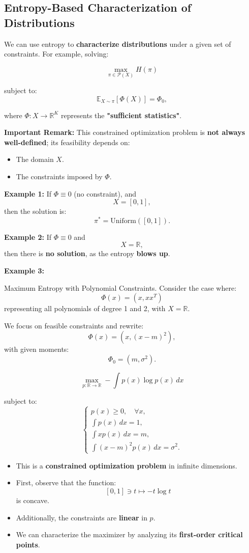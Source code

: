 \documentclass{article}
\begin{document}
\subsection{Entropy-Based Characterization of Distributions}

We can use entropy to \textbf{characterize distributions} under a given set of constraints. For example, solving:

\[
\max_{\pi \in \mathcal{P}(X)} H(\pi)
\]

subject to:
\[
\mathbb{E}_{X \sim \pi} [\Phi(X)] = \Phi_0,
\]

where \( \Phi: X \to \mathbb{R}^K \) represents the \textbf{"sufficient statistics"}.

\textbf{Important Remark:}
This constrained optimization problem is \textbf{not always well-defined}; its feasibility depends on:
\begin{itemize}
    \item The domain \( X \).
    \item The constraints imposed by \( \Phi \).
\end{itemize}

\textbf{Example 1:} If \( \Phi \equiv 0 \) (no constraint), and
\[
X = [0,1],
\]
then the solution is:
\[
\pi^* = \text{Uniform}([0,1]).
\]

\textbf{Example 2:} If \( \Phi \equiv 0 \) and 
\[
X = \mathbb{R},
\]
then there is \textbf{no solution}, as the entropy \textbf{blows up}.

\textbf{Example 3:}

Maximum Entropy with Polynomial Constraints. 
Consider the case where:
\[
\Phi(x) = (x, x x^T)
\]
representing all polynomials of degree 1 and 2, with \( X = \mathbb{R} \).

We focus on feasible constraints and rewrite:
\[
\Phi(x) = (x, (x - m)^2),
\]
with given moments:
\[
\Phi_0 = (m, \sigma^2).
\]

\[
\max_{p: \mathbb{R} \to \mathbb{R}} - \int p(x) \log p(x) \, dx
\]

subject to:
\[
\begin{cases}
p(x) \geq 0, \quad \forall x, \\
\int p(x) \, dx = 1, \\
\int x p(x) \, dx = m, \\
\int (x - m)^2 p(x) \, dx = \sigma^2.
\end{cases}
\]

\begin{itemize}
    \item This is a \textbf{constrained optimization problem} in infinite dimensions.
    \item First, observe that the function:
    \[
    [0,1] \ni t \mapsto -t \log t
    \]
    is concave.
    \item Additionally, the constraints are \textbf{linear} in \( p \).
    \item We can characterize the maximizer by analyzing its \textbf{first-order critical points}.
\end{itemize}
\end{document}
